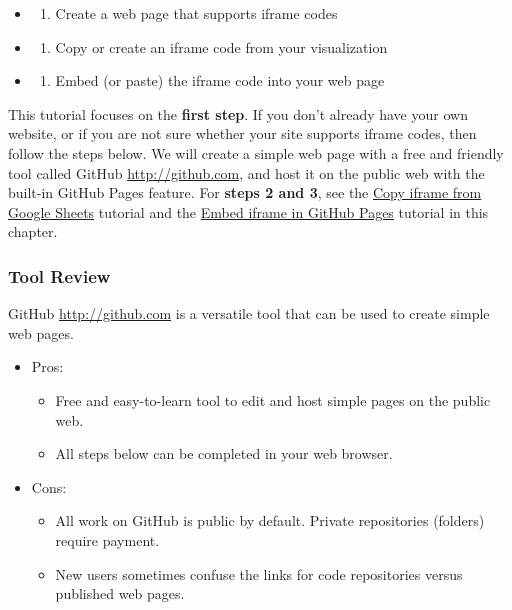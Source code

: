 \documentclass[
  english,
]{book}
\providecommand{\tightlist}{%
  \setlength{\itemsep}{0pt}\setlength{\parskip}{0pt}}
\begin{document}
\begin{itemize}
\item
  \begin{enumerate}
  \def\labelenumi{\arabic{enumi})}
  \tightlist
  \item
    Create a web page that supports iframe codes
  \end{enumerate}
\item
  \begin{enumerate}
  \def\labelenumi{\arabic{enumi})}
  \setcounter{enumi}{1}
  \tightlist
  \item
    Copy or create an iframe code from your visualization
  \end{enumerate}
\item
  \begin{enumerate}
  \def\labelenumi{\arabic{enumi})}
  \setcounter{enumi}{2}
  \tightlist
  \item
    Embed (or paste) the iframe code into your web page
  \end{enumerate}
\end{itemize}

This tutorial focuses on the \textbf{first step}. If you don't already have your own website, or if you are not sure whether your site supports iframe codes, then follow the steps below. We will create a simple web page with a free and friendly tool called GitHub \url{http://github.com}, and host it on the public web with the built-in GitHub Pages feature. For \textbf{steps 2 and 3}, see the \href{iframe-google-sheets}{Copy iframe from Google Sheets} tutorial and the \href{iframe-github/}{Embed iframe in GitHub Pages} tutorial in this chapter.

\hypertarget{tool-review-4}{%
\subsubsection*{Tool Review}\label{tool-review-4}}

GitHub \url{http://github.com} is a versatile tool that can be used to create simple web pages.

\begin{itemize}
\tightlist
\item
  Pros:

  \begin{itemize}
  \tightlist
  \item
    Free and easy-to-learn tool to edit and host simple pages on the public web.
  \item
    All steps below can be completed in your web browser.
  \end{itemize}
\item
  Cons:

  \begin{itemize}
  \tightlist
  \item
    All work on GitHub is public by default. Private repositories (folders) require payment.
  \item
    New users sometimes confuse the links for code repositories versus published web pages.
  \end{itemize}
\end{itemize}
\end{document}
